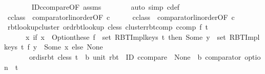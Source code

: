 \begin{isabellebody}
\ \ \ \ \ \ \isamarkupfalse%
\ ID{\isacharunderscore}{\kern0pt}ccompare{\isacharprime}{\kern0pt}{\isacharbrackleft}{\kern0pt}OF\ assms{\isacharparenleft}{\kern0pt}{}{\isacharparenright}{\kern0pt}{\isacharbrackright}{\kern0pt}\isanewline
\ \ \ \ \ \ \isamarkupfalse%
\ {\isacharparenleft}{\kern0pt}auto\ simp{\isacharcolon}{\kern0pt}\ c{\isacharprime}{\kern0pt}{\isacharunderscore}{\kern0pt}def{\isacharparenright}{\kern0pt}\isanewline
\ \ \ \ \isamarkupfalse%
\ c{\isacharunderscore}{\kern0pt}class\ {\isacharequal}{\kern0pt}\ comparator{\isachardot}{\kern0pt}linorder{\isacharbrackleft}{\kern0pt}OF\ c{\isacharbrackright}{\kern0pt}\isanewline
\ \ \ \ \isamarkupfalse%
\ c{\isacharprime}{\kern0pt}{\isacharunderscore}{\kern0pt}class\ {\isacharequal}{\kern0pt}\ comparator{\isachardot}{\kern0pt}linorder{\isacharbrackleft}{\kern0pt}OF\ c{\isacharprime}{\kern0pt}{\isacharbrackright}{\kern0pt}\isanewline
\ \ \ \ \isamarkupfalse%
\ rbt{\isacharunderscore}{\kern0pt}lookup{\isacharunderscore}{\kern0pt}cluster{\isacharcolon}{\kern0pt}\ {\isachardoublequoteopen}ord{\isachardot}{\kern0pt}rbt{\isacharunderscore}{\kern0pt}lookup\ cless\ {\isacharparenleft}{\kern0pt}cluster{\isacharunderscore}{\kern0pt}rbt{\isacharunderscore}{\kern0pt}comp\ ccomp\ f\ t{\isacharparenright}{\kern0pt}\ {\isacharequal}{\kern0pt}\isanewline
\ \ \ \ \ \ {\isacharparenleft}{\kern0pt}{\isasymlambda}x{\isachardot}{\kern0pt}\ if\ x\ {\isasymin}\ Option{\isachardot}{\kern0pt}these\ {\isacharparenleft}{\kern0pt}f\ {\isacharbackquote}{\kern0pt}\ {\isacharparenleft}{\kern0pt}set\ {\isacharparenleft}{\kern0pt}RBT{\isacharunderscore}{\kern0pt}Impl{\isachardot}{\kern0pt}keys\ t{\isacharparenright}{\kern0pt}{\isacharparenright}{\kern0pt}{\isacharparenright}{\kern0pt}\ then\ Some\ {\isacharbraceleft}{\kern0pt}y\ {\isasymin}\ {\isacharparenleft}{\kern0pt}set\ {\isacharparenleft}{\kern0pt}RBT{\isacharunderscore}{\kern0pt}Impl{\isachardot}{\kern0pt}keys\ t{\isacharparenright}{\kern0pt}{\isacharparenright}{\kern0pt}{\isachardot}{\kern0pt}\ f\ y\ {\isacharequal}{\kern0pt}\ Some\ x{\isacharbraceright}{\kern0pt}\ else\ None{\isacharparenright}{\kern0pt}{\isachardoublequoteclose}\isanewline
\ \ \ \ \ \ \ {\isachardoublequoteopen}ord{\isachardot}{\kern0pt}is{\isacharunderscore}{\kern0pt}rbt\ cless\ {\isacharparenleft}{\kern0pt}t\ {\isacharcolon}{\kern0pt}{\isacharcolon}{\kern0pt}\ {\isacharparenleft}{\kern0pt}{\isacharprime}{\kern0pt}b{\isacharcomma}{\kern0pt}\ unit{\isacharparenright}{\kern0pt}\ rbt{\isacharparenright}{\kern0pt}\ {\isasymor}\ ID\ ccompare\ {\isacharequal}{\kern0pt}\ {\isacharparenleft}{\kern0pt}None\ {\isacharcolon}{\kern0pt}{\isacharcolon}{\kern0pt}\ {\isacharprime}{\kern0pt}b\ comparator\ option{\isacharparenright}{\kern0pt}{\isachardoublequoteclose}\ \ t\isanewline

\end{isabellebody}
